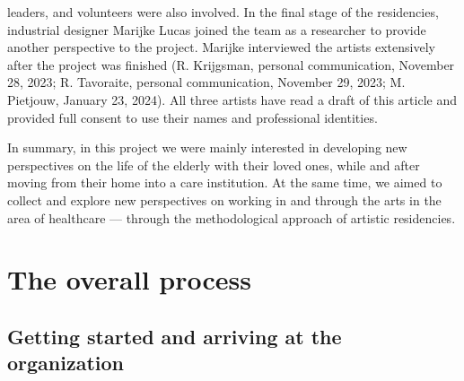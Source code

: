 \documentclass[authordate, empirical]{jote-new-article}
\begin{document}
{leaders, and volunteers were also involved. In the final stage of the residencies, industrial designer Marijke Lucas joined the team as a researcher to provide another perspective to the project. Marijke interviewed the artists extensively after the project was finished (R. Krijgsman, personal communication, November 28, 2023; R. Tavoraite, personal communication, November 29, 2023; M. Pietjouw, January 23, 2024). All three artists have read a draft of this article and provided full consent to use their names and professional identities.


	}

	





	In summary, in this project we were mainly interested in developing new perspectives on the life of the elderly with their loved ones, while and after moving from their home into a care institution. At the same time, we aimed to collect and explore new perspectives on working in and through the arts in the area of healthcare --- through the methodological approach of artistic residencies.







	\section{The overall process}



	\subsection{Getting started and arriving at the organization }
\end{document}
